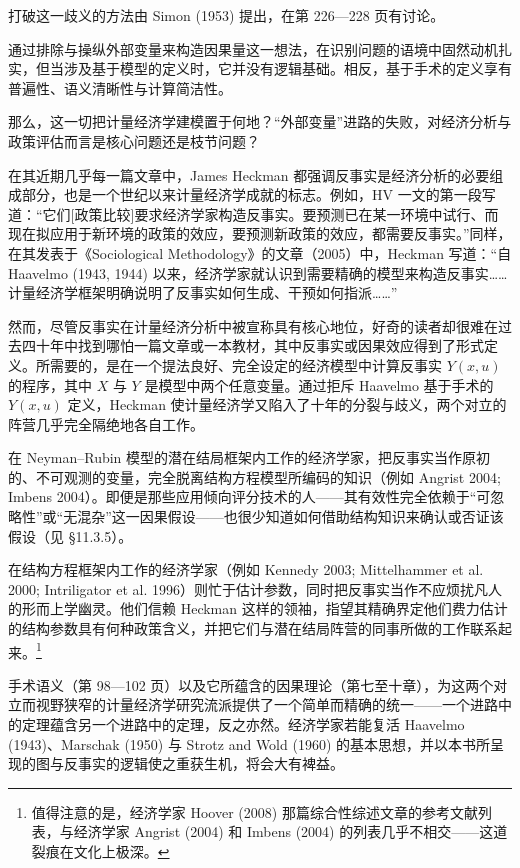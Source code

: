 打破这一歧义的方法由 Simon (1953) 提出，在第 226—228 页有讨论。


通过排除与操纵外部变量来构造因果量这一想法，在识别问题的语境中固然动机扎实，但当涉及基于模型的定义时，它并没有逻辑基础。相反，基于手术的定义享有普遍性、语义清晰性与计算简洁性。

那么，这一切把计量经济学建模置于何地？“外部变量”进路的失败，对经济分析与政策评估而言是核心问题还是枝节问题？

在其近期几乎每一篇文章中，James Heckman 都强调反事实是经济分析的必要组成部分，也是一个世纪以来计量经济学成就的标志。例如，HV 一文的第一段写道：“它们[政策比较]要求经济学家构造反事实。要预测已在某一环境中试行、而现在拟应用于新环境的政策的效应，要预测新政策的效应，都需要反事实。”同样，在其发表于《Sociological Methodology》的文章（2005）中，Heckman 写道：“自 Haavelmo (1943, 1944) 以来，经济学家就认识到需要精确的模型来构造反事实……计量经济学框架明确说明了反事实如何生成、干预如何指派……”

然而，尽管反事实在计量经济分析中被宣称具有核心地位，好奇的读者却很难在过去四十年中找到哪怕一篇文章或一本教材，其中反事实或因果效应得到了形式定义。所需要的，是在一个提法良好、完全设定的经济模型中计算反事实 $Y(x,u)$ 的程序，其中 $X$ 与 $Y$ 是模型中两个任意变量。通过拒斥 Haavelmo 基于手术的 $Y(x,u)$ 定义，Heckman 使计量经济学又陷入了十年的分裂与歧义，两个对立的阵营几乎完全隔绝地各自工作。

在 Neyman–Rubin 模型的潜在结局框架内工作的经济学家，把反事实当作原初的、不可观测的变量，完全脱离结构方程模型所编码的知识（例如 Angrist 2004; Imbens 2004）。即便是那些应用倾向评分技术的人——其有效性完全依赖于“可忽略性”或“无混杂”这一因果假设——也很少知道如何借助结构知识来确认或否证该假设（见 \S11.3.5）。

在结构方程框架内工作的经济学家（例如 Kennedy 2003; Mittelhammer et al. 2000; Intriligator et al. 1996）则忙于估计参数，同时把反事实当作不应烦扰凡人的形而上学幽灵。他们信赖 Heckman 这样的领袖，指望其精确界定他们费力估计的结构参数具有何种政策含义，并把它们与潜在结局阵营的同事所做的工作联系起来。\footnote{值得注意的是，经济学家 Hoover (2008) 那篇综合性综述文章的参考文献列表，与经济学家 Angrist (2004) 和 Imbens (2004) 的列表几乎不相交——这道裂痕在文化上极深。}

手术语义（第 98—102 页）以及它所蕴含的因果理论（第七至十章），为这两个对立而视野狭窄的计量经济学研究流派提供了一个简单而精确的统一——一个进路中的定理蕴含另一个进路中的定理，反之亦然。经济学家若能复活 Haavelmo (1943)、Marschak (1950) 与 Strotz and Wold (1960) 的基本思想，并以本书所呈现的图与反事实的逻辑使之重获生机，将会大有裨益。

